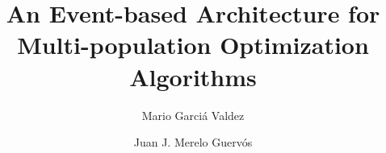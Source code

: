 \documentclass[review]{elsarticle}
\begin{document}
\begin{frontmatter}

\title{An Event-based Architecture for Multi-population Optimization Algorithms}




\author[itt]{Mario Garci\'a Valdez }

\author[granada]{Juan J. Merelo Guerv\'os}

\address[itt]{Department of Graduate Studies, Instituto Tecnol\'ogico de Tijuana, Tijuana BC, Mexico}
\address[granada]{Universidad de Granada, Granada, Spain}


\end{frontmatter}
\end{document}

